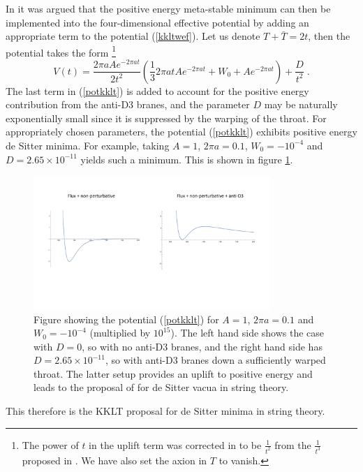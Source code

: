 \documentclass[11pt,a4paper]{article}
\numberwithin{equation}{section}
\numberwithin{table}{section}\setlength{\multlinegap}{25pt}
\newcommand{\be}{\begin{equation}}
\newcommand{\ee}{\end{equation}}
\begin{document}
{In \cite{Kachru:2003aw} it was argued that the positive energy meta-stable minimum can then be implemented into the four-dimensional effective potential by adding an appropriate term to the potential (\ref{kkltwef}). Let us denote $T+\bar{T}=2t$, then the potential takes the form \cite{Kachru:2003aw,Kachru:2003sx}\footnote{The power of $t$ in the uplift term was corrected in \cite{Kachru:2003sx} to be $\frac{1}{t^2}$ from the $\frac{1}{t^3}$ proposed in \cite{Kachru:2003aw}. We have also set the axion in $T$ to vanish.}
\be
V\left(t\right) = \frac{2 \pi a A e^{-2 \pi a t}}{2 t^2} \left( \frac13 2 \pi a t A e^{-2 \pi a t} + W_0 + A e^{-2 \pi a t} \right) + \frac{D}{t^2} \;.
\label{potkklt}
\ee
The last term in (\ref{potkklt}) is added to account for the positive energy contribution from the anti-D3 branes, and the parameter $D$ may be naturally exponentially small since it is suppressed by the warping of the throat. For appropriately chosen parameters, the potential (\ref{potkklt}) exhibits positive energy de Sitter minima. For example, taking $A=1$, $2 \pi a = 0.1$, $W_0 = -10^{-4}$ and $D=2.65\times10^{-11}$ yields such a minimum. This is shown in figure \ref{fig:kklt}.
\begin{figure}[t]
\centering
 \includegraphics[width=0.8\textwidth]{kklt.pdf}
\caption{Figure showing the potential (\ref{potkklt}) for $A=1$, $2 \pi a = 0.1$ and $W_0 = -10^{-4}$ (multiplied by $10^{15}$). The left hand side shows the case with $D=0$, so with no anti-D3 branes, and the right hand side has $D=2.65\times10^{-11}$, so with anti-D3 branes down a sufficiently warped throat. The latter setup provides an uplift to positive energy and leads to the proposal of \cite{Kachru:2003aw} for de Sitter vacua in string theory.}
\label{fig:kklt}
\end{figure}
This therefore is the KKLT proposal for de Sitter minima in string theory. 

}
\end{document}

